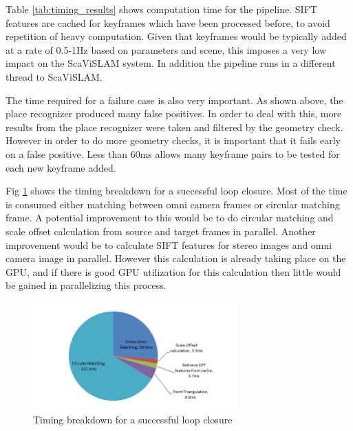 Table \ref{tab:timing_results} shows computation time for the pipeline.  SIFT features are cached for keyframes which have been processed before, to avoid repetition of heavy computation.  Given that keyframes would be typically added at a rate of 0.5-1Hz based on parameters and scene, this imposes a very low impact on the ScaViSLAM system.  In addition the pipeline runs in a different thread to ScaViSLAM.

The time required for a failure case is also very important.  As shown above, the place recognizer produced many false positives.  In order to deal with this, more results from the place recognizer were taken and filtered by the geometry check.  However in order to do more geometry checks, it is important that it fails early on a false positive.  Less than 60ms allows many keyframe pairs to be tested for each new keyframe added.

Fig \ref{fig:pie_graph} shows the timing breakdown for a successful loop closure.  Most of the time is consumed either matching between omni camera frames or circular matching frame.  A potential improvement to this would be to do circular matching and scale offset calculation from source and target frames in parallel.  Another improvement would be to calculate SIFT features for stereo images and omni camera image in parallel.  However this calculation is already taking place on the GPU, and if there is good GPU utilization for this calculation then little would be gained in parallelizing this process.


\begin{figure}[H]
  \centering
    \includegraphics[width=0.7\textwidth]{chapters/images/pie_graph}
  \caption{Timing breakdown for a successful loop closure}
  \label{fig:pie_graph}
\end{figure}